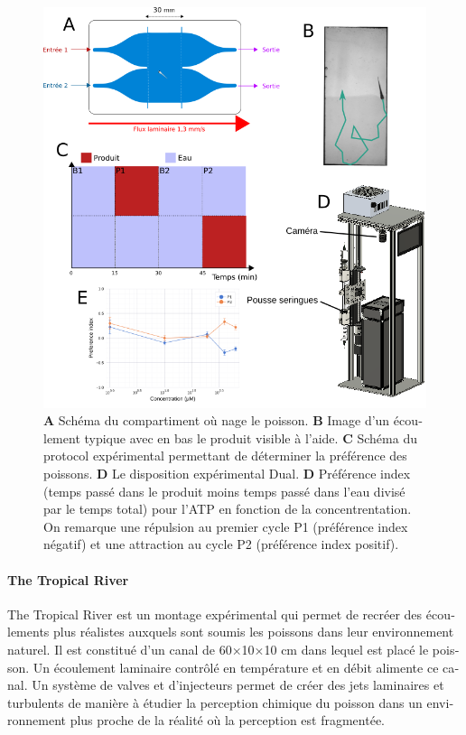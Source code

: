 \begin{otherlanguage}{french}
    \begin{figure}[h!]
      \centering
      \includegraphics[width=1\textwidth]{part_2/assets/resume1.png}
      \caption{\textbf{A} Schéma du compartiment où nage le poisson. \textbf{B} Image d'un écoulement typique avec en bas le produit visible à l'aide. \textbf{C} Schéma du protocol expérimental permettant de déterminer la préférence des poissons. \textbf{D} Le disposition expérimental Dual. \textbf{D} Préférence index (temps passé dans le produit moins temps passé dans l'eau divisé par le temps total) pour l'ATP en fonction de la concentrentation. On remarque une répulsion au premier cycle P1 (préférence index négatif) et une attraction au cycle P2 (préférence index positif).}
      \label{}
    \end{figure}

\paragraph{The Tropical River} The Tropical River est un montage expérimental qui permet de recréer des écoulements plus réalistes auxquels sont soumis les poissons dans leur environnement naturel. Il est constitué d'un canal de 60×10×10 cm dans lequel est placé le poisson. Un écoulement laminaire contrôlé en température et en débit alimente ce canal. Un système de valves et d'injecteurs permet de créer des jets laminaires et turbulents de manière à étudier la perception chimique du poisson dans un environnement plus proche de la réalité où la perception est fragmentée.


\end{otherlanguage}
